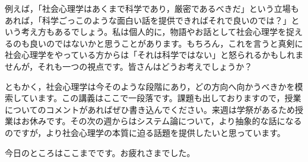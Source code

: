 \documentclass{ltjsbook}
\begin{document}
例えば，「社会心理学はあくまで科学であり，厳密であるべきだ」という立場もあれば，「科学ごっこのような面白い話を提供できればそれで良いのでは？」という考え方もあるでしょう。私は個人的に，物語やお話として社会心理学を捉えるのも良いのではないかと思うことがあります。もちろん，これを言うと真剣に社会心理学をやっている方からは「それは科学ではない」と怒られるかもしれませんが，それも一つの視点です。皆さんはどうお考えでしょうか？

ともかく，社会心理学は今そのような段階にあり，どの方向へ向かうべきかを模索しています。この講義はここで一段落です。課題も出しておりますので，授業についてのコメントがあればぜひ書き込んでください。来週は学祭があるため授業はお休みです。その次の週からはシステム論について，より抽象的な話になるのですが，より社会心理学の本質に迫る話題を提供したいと思っています。

今日のところはここまでです。お疲れさまでした。
\end{document}
